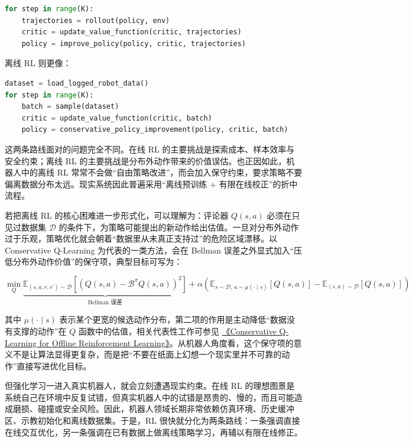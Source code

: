\begin{lstlisting}[language=python]
for step in range(K):
    trajectories = rollout(policy, env)
    critic = update_value_function(critic, trajectories)
    policy = improve_policy(policy, critic, trajectories)
\end{lstlisting}

离线 RL 则更像：

\begin{lstlisting}[language=python]
dataset = load_logged_robot_data()
for step in range(K):
    batch = sample(dataset)
    critic = update_value_function(critic, batch)
    policy = conservative_policy_improvement(policy, critic, batch)
\end{lstlisting}

这两条路线面对的问题完全不同。在线 RL 的主要挑战是探索成本、样本效率与安全约束；离线 RL 的主要挑战是分布外动作带来的价值误估。也正因如此，机器人中的离线 RL 常常不会做“自由策略改进”，而会加入保守约束，要求策略不要偏离数据分布太远。现实系统因此普遍采用“离线预训练 + 有限在线校正”的折中流程。

若把离线 RL 的核心困难进一步形式化，可以理解为：评论器 \(Q(s,a)\) 必须在只见过数据集 \(\mathcal{D}\) 的条件下，为策略可能提出的新动作给出估值。一旦对分布外动作过于乐观，策略优化就会朝着“数据里从未真正支持过”的危险区域漂移。以 Conservative Q-Learning 为代表的一类方法，会在 Bellman 误差之外显式加入“压低分布外动作价值”的保守项，典型目标可写为：

\begingroup
\scriptsize
\begin{equation*}
\min_Q \underbrace{\mathbb{E}_{(s,a,r,s')\sim\mathcal{D}}\left[\left(Q(s,a)-\mathcal{B}^{\pi}Q(s,a)\right)^2\right]}_{\text{Bellman 误差}}
+ \alpha\left(\mathbb{E}_{s\sim\mathcal{D},\,a\sim\mu(\cdot\mid s)}[Q(s,a)]-\mathbb{E}_{(s,a)\sim\mathcal{D}}[Q(s,a)]\right)
\end{equation*}
\endgroup

其中 \(\mu(\cdot\mid s)\) 表示某个更宽的候选动作分布，第二项的作用是主动降低“数据没有支撑的动作”在 \(Q\) 函数中的估值，相关代表性工作可参见 \href{https://arxiv.org/abs/2006.04779}{《Conservative Q-Learning for Offline Reinforcement Learning》}。从机器人角度看，这个保守项的意义不是让算法显得更复杂，而是把“不要在纸面上幻想一个现实里并不可靠的动作”直接写进优化目标。

但强化学习一进入真实机器人，就会立刻遭遇现实约束。在线 RL 的理想图景是系统自己在环境中反复试错，但真实机器人中的试错是昂贵的、慢的，而且可能造成磨损、碰撞或安全风险。因此，机器人领域长期非常依赖仿真环境、历史缓冲区、示教初始化和离线数据集。于是，RL 很快就分化为两条路线：一条强调直接在线交互优化，另一条强调在已有数据上做离线策略学习，再辅以有限在线修正。

